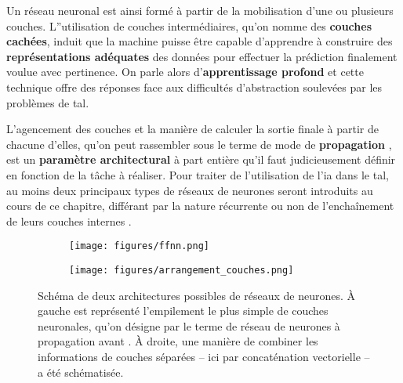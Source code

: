 \documentclass[12pt, twoside]{report}
\begin{document}
Un réseau neuronal est ainsi formé à partir de la mobilisation d'une ou plusieurs couches. L''utilisation de couches intermédiaires, qu'on nomme des \textbf{couches cachées}, induit que la machine puisse être capable d'apprendre à construire des \textbf{représentations adéquates} des données pour effectuer la prédiction finalement voulue avec pertinence. On parle alors d'\textbf{apprentissage profond} et cette technique offre des réponses face aux difficultés d'abstraction soulevées par les problèmes de \Gls{tal}.

L'agencement des couches et la manière de calculer la sortie finale à partir de chacune d'elles, qu'on peut rassembler sous le terme de \og mode de \textbf{propagation} \fg, est un \textbf{paramètre architectural} à part entière qu'il faut judicieusement définir en fonction de la tâche à réaliser. Pour traiter de l'utilisation de l'\Gls{ia} dans le \Gls{tal}, au moins deux principaux types de réseaux de neurones seront introduits au cours de ce chapitre, différant par la nature récurrente ou non de l'enchaînement de leurs couches internes \autocite[chap.~7]{jurafsky}.

\begin{figure}[!h]
    \centering
    \begin{subfigure}[b]{0.5\textwidth}
        \texttt{[image: figures/ffnn.png]}
    \end{subfigure}\hspace{0,5cm}
    \begin{subfigure}[b]{0.4\textwidth}
        \texttt{[image: figures/arrangement\_couches.png]}
    \end{subfigure}
    \caption{Schéma de deux architectures possibles de réseaux de neurones. À gauche est représenté l'empilement le plus simple de couches neuronales, qu'on désigne par le terme de \og{} réseau de neurones à propagation avant \fg{}. À droite, une manière de combiner les informations de couches séparées -- ici par concaténation vectorielle -- a été schématisée.}
\end{figure}

\end{document}
